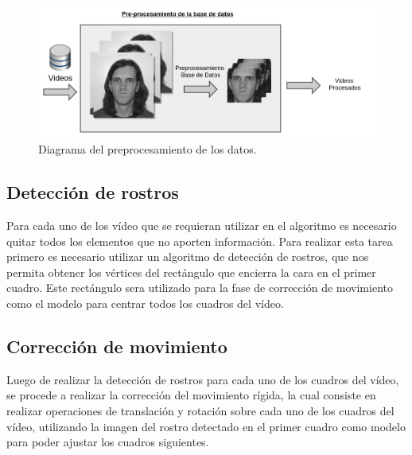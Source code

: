 	\begin{figure}[tb]
		\centering
    		\includegraphics[width=1\textwidth]{Figuras/Diagramas/Preprocesamiento.png}
  		\caption{Diagrama del preprocesamiento de los datos.}
  		\label{algoritmo:fig:preprocesamiento}
	\end{figure}	

	
	\subsection{Detección de rostros}
	\label{algoritmo:det_rostro}
	Para cada uno de los vídeo que se requieran utilizar en el algoritmo es necesario quitar todos los elementos que no aporten información. Para realizar esta tarea primero es necesario utilizar un algoritmo de detección de rostros, que nos permita obtener los vértices del rectángulo que encierra la cara en el primer cuadro. Este rectángulo sera utilizado para la fase de corrección de movimiento como el modelo para centrar todos los cuadros del vídeo.	
		
	\subsection{Corrección de movimiento}
	\label{algoritmo:cor_movimiento}
	Luego de realizar la detección de rostros para cada uno de los cuadros del vídeo, se procede a realizar la corrección del movimiento rígida, la cual consiste en realizar operaciones de translación y rotación sobre cada uno de los cuadros del vídeo, utilizando la imagen del rostro detectado en el primer cuadro como modelo para poder ajustar los cuadros siguientes.


